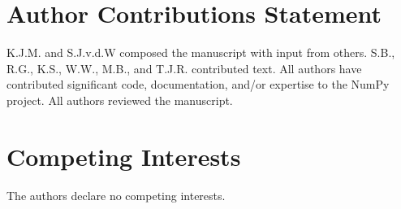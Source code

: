 \documentclass[fleqn,10pt,twocolumn]{wlscirep}
\begin{document}
\section*{Author Contributions Statement}

K.J.M. and S.J.v.d.W composed the manuscript with input from others.
S.B., R.G., K.S., W.W., M.B., and T.J.R. contributed text.
All authors have contributed significant code, documentation, and/or expertise
to the NumPy project.
All authors reviewed the manuscript.

\section*{Competing Interests}

The authors declare no competing interests.
\end{document}
